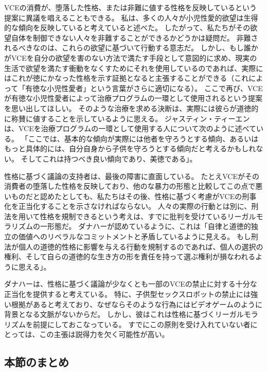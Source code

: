 \documentclass[paper=a4,book,openany]{jlreq} \usepackage{mystyle}
\begin{document}
VCEの消費が、堕落した性格、または非難に値する性格を反映しているという提案に異議を唱えることもできる。
私は、多くの人々が小児性愛的欲望は生得的な傾向を反映していると考えていると述べた。
したがって、私たちがその欲望自体を制御できない人々を非難することができるかどうかは疑問だ。
非難されるべきなのは、これらの欲望に基づいて行動する意志だ。
しかし、もし誰かがVCEを自分の欲望を害のない方法で満たす手段として意図的に求め、現実の生活で欲望を満たす衝動をなくすためにそれを使用しているのであれば、実際にはこれが徳にかなった性格を示す証拠となると主張することができる（これによって「有徳な小児性愛者」という言葉がさらに適切になる）。
ここで再び、VCEが有徳な小児性愛者によって治療プログラムの一環として使用されるという提案を思い出してほしい。
そのような治療を求める決断は、実際には彼らが道徳的に称賛に値することを示しているように思える。
ジャスティン・ティーエンは、VCEを治療プログラムの一環として使用する人について次のように述べている。
「ここでは、基本的な傾向が実際には他者を守ろうとする傾向、あるいはもっと具体的には、自分自身から子供を守ろうとする傾向だと考えるかもしれない。
そしてこれは持つべき良い傾向であり、美徳である」\citep[p.1159]{tiehen18:_virtual_ethic_creep_act}。

性格に基づく議論の支持者は、最後の障害に直面している。
たとえVCEがその消費者の堕落した性格を反映しており、他のな暴力の形態と比較してこの点で悪いものだと認めたとしても、私たちはその後、性格に基づく考慮がVCEの刑事化を正当化することを示さなければならない。
人々の実際の行動とは別に、刑法を用いて性格を規制できるという考えは、すでに批判を受けているリーガルモラリズムの一形態だ。
ダナハーが認めているように、これは「自律と道徳的独立の価値へのリベラルなコミットメントと矛盾しているように見える。
もし刑法が個人の道徳的性格に影響を与える行動を規制するのであれば、個人の選択の権利、そして自らの道徳的な生き方の形を責任を持って選ぶ権利が損なわれるように思える」\citep[p.79]{danaher17:_robot_rape_robot_child_sexual_abuse}。

ダナハーは、性格に基づく議論が少なくとも一部のVCEの禁止に対する十分な正当化を提供すると考えている。
特に、子供型セックスロボットの禁止には強い根拠があると考えており、なぜならそのような行為にはビデオゲームのように背景となる文脈がないからだ。
しかし、彼はこれは性格に基づくリーガルモラリズムを前提にしておこなっている。
すでにこの原則を受け入れていない者にとっては、この主張は説得力を欠く可能性が高い。

\subsection{本節のまとめ}
\end{document}
